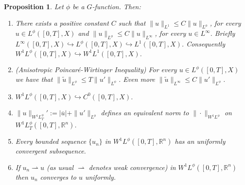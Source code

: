 \documentclass[twoside]{article}
\theoremstyle{definition}
\theoremstyle{plain}
\newtheorem{Propos}[definition]{Proposition}
\theoremstyle{remark}
\newcommand{\orlnor}{\|_{L^{\phi}}}
\newcommand{\lphi}{L^{\phi}}
\newcommand{\wphi}{W^{1}\lphi}
\newcommand{\wphit}{W^{1}\lphi_T}
\newcommand{\sobnor}{\|_{W^{1}\lphi}}
\newcommand{\sobnort}{\|_{W^{1}\lphi_T}}
\newcommand{\rr}{\mathbb{R}}
\begin{document}
  \begin{Propos}\label{prop:prop_espacios} Let $\phi$ be a $G$-function. Then:
  \begin{enumerate}
\item\label{it:1} There exists a positive constant   $C$ such that $\|u\|_{L^1}\leq C\|u\|_{L^\phi}$, for every $u\in L^\phi([0,T],X)$ and $\|u\|_{L^\phi}\leq C\|u\|_{L^\infty}$, for every $u\in L^\infty$. Briefly $L^\infty([0,T],X) \hookrightarrow L^\phi([0,T],X)\hookrightarrow L^1([0,T],X)$. Consequently\linebreak $\wphi([0,T],X) \hookrightarrow W^1L^1([0,T],X) $.

\item\label{it:1,5} (Anisotropic Poincaré-Wirtinger Inequality) For every $u\in\lphi([0,T],X)$ we have that $\|\tilde{u}\orlnor\leq T\|u'\orlnor$.  Even more $\|\tilde{u}\|_{L^\infty}\leq C\|u'\orlnor$.


  \item\label{it:2}  $\wphi([0,T],X) \hookrightarrow  C^0([0,T],X)$.

\item\label{it:4} $\|u\sobnort':=|\overline{u}|+\|u'\orlnor$ defines an equivalent norm to $\|\cdot\sobnor$ on \linebreak $\wphit([0,T],\rr^n)$.

\item\label{it:5} Every bounded sequence $\{u_n\}$ in  $\wphi([0,T],\rr^n)$  has an uniformly convergent subsequence.

\item\label{it:6}   If  $u_n\rightharpoonup u$  (as usual $\rightharpoonup $ denotes weak convergence)   in  $\wphi([0,T],\rr^n)$ then $u_n$ converges to $u$ uniformly.
     \end{enumerate}
  \end{Propos}
\end{document}
